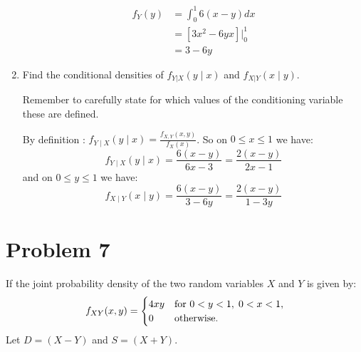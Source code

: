 \documentclass{article}
\newcommand{\1}{\mathbf{1}}
\begin{document}
\begin{enumerate}
    \begin{align*}
    f_Y(y) &= \int_0^1 6(x-y) dx \\
    &= \left[3x^2 - 6yx\right]\bigg|_0^1 \\
    &= 3 - 6y
    \end{align*}

    \newpage
    \item Find the conditional densities of $f_{Y|X}(y\mid x)$ and $f_{X|Y}(x\mid y)$.\par
    Remember to carefully state for which values of the conditioning variable these are defined.
    
    By definition : $f_{Y\mid X}(y \mid x) = \frac{f_{X, Y}(x, y)}{f_X(x)}$. So on $0\leq x \leq 1$ we have:
    $$ f_{Y\mid X}(y \mid x) = \frac{6(x-y)}{6x-3} = \frac{2(x-y)}{2x-1} $$
    and on $0\leq y\leq 1 $ we have:
    $$ f_{X\mid Y}(x \mid y) = \frac{6(x-y)}{3-6y} = \frac{2(x-y)}{1-3y} $$
   
\end{enumerate}



\newpage
\section*{Problem 7} 
If the joint probability density of the two random variables $X$ and $Y$ is given by:
$$ f_{XY}(x,y) = \begin{cases}
    4xy & \hbox{for } 0 < y<1,\; 0<x <1,\\
    0 & \hbox{otherwise.}
    \end{cases}$$
Let $D=(X-Y)$ and $S=(X+Y)$.  
\end{document}
